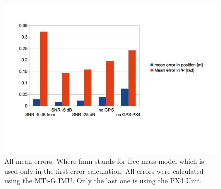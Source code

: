 \begin{figure}[hb]
\centering
\includegraphics[width=1\textwidth]{pictures/mean_error.png}
\caption{All mean errors. Where fmm stands for free mass model which is used only in the first error calculation. All errors were calculated using the MTi-G IMU. Only the last one is using the PX4 Unit.}
\label{mean_error}
\end{figure}




